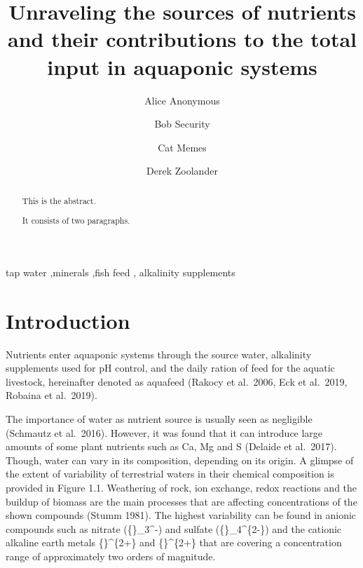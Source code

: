 \documentclass[preprint, 3p,
authoryear]{elsarticle} %
\begin{document}
\begin{frontmatter}

  \title{Unraveling the sources of nutrients and their contributions to
the total input in aquaponic systems}
    \author[Some Institute of Technology]{Alice Anonymous%
  }
    \author[Another University]{Bob Security%
  }
    \author[Another University]{Cat Memes%
  }
    \author[Some Institute of Technology]{Derek Zoolander%
  }
  
  \begin{abstract}
  This is the abstract.

  It consists of two paragraphs.
  \end{abstract}
    \begin{keyword}
    tap water \sep minerals \sep fish feed \sep 
    alkalinity supplements
  \end{keyword}
  
 \end{frontmatter}

\hypertarget{introduction}{%
\section{Introduction}\label{introduction}}

Nutrients enter aquaponic systems through the source water, alkalinity
supplements used for pH control, and the daily ration of feed for the
aquatic livestock, hereinafter denoted as aquafeed (Rakocy et al.~2006,
Eck et al.~2019, Robaina et al.~2019).

The importance of water as nutrient source is usually seen as negligible
(Schmautz et al.~2016). However, it was found that it can introduce
large amounts of some plant nutrients such as Ca, Mg and S (Delaide et
al.~2017). Though, water can vary in its composition, depending on its
origin. A glimpse of the extent of variability of terrestrial waters in
their chemical composition is provided in Figure 1.1. Weathering of
rock, ion exchange, redox reactions and the buildup of biomass are the
main processes that are affecting concentrations of the shown compounds
(Stumm 1981). The highest variability can be found in anionic compounds
such as nitrate (\{\}\_3\^{}-) and sulfate
(\{\}\_4\^{}\{2-\}) and the cationic alkaline earth metals
\{\}\^{}\{2+\} and \{\}\^{}\{2+\} that are
covering a concentration range of approximately two orders of magnitude.
\end{document}
